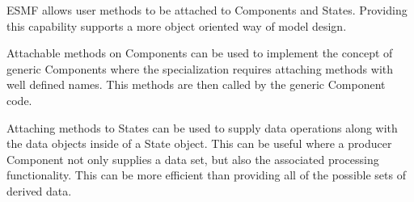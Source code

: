 %





ESMF allows user methods to be attached to Components and States. Providing
this capability supports a more object oriented way of model design. 

Attachable methods on Components can be used to implement the concept of
generic Components where the specialization requires attaching methods with
well defined names. This methods are then called by the generic Component 
code.

Attaching methods to States can be used to supply data operations along with
the data objects inside of a State object. This can be useful where a producer
Component not only supplies a data set, but also the associated processing
functionality. This can be more efficient than providing all of the possible
sets of derived data.
